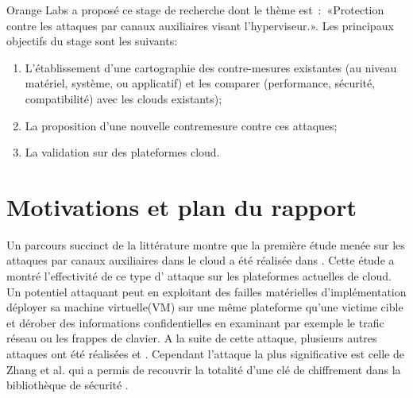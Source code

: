 Orange Labs a proposé ce stage de recherche dont le thème est : «Protection contre les attaques par canaux auxiliaires visant l’hyperviseur.». Les principaux objectifs du stage sont les suivants:
\begin{enumerate}
\item L'établissement d'une cartographie des contre-mesures existantes (au niveau matériel, système, ou applicatif) et les comparer (performance, sécurité, compatibilité) avec les clouds existants);
\item La proposition d'une nouvelle contremesure contre ces attaques;
\item La validation sur des plateformes cloud.
\end{enumerate}    

\section{Motivations et plan du rapport}    
\label{sec:plan} 

Un parcours succinct de la littérature montre que la première étude menée  sur les attaques par canaux auxiliaires dans le cloud a été réalisée dans \cite{Ris2009}. Cette étude a montré l’effectivité de ce type d' attaque sur les plateformes actuelles de cloud.  Un potentiel attaquant peut  en exploitant des  failles matérielles d’implémentation  déployer sa machine virtuelle(VM) sur une même plateforme qu’une victime cible et dérober des informations confidentielles en examinant par exemple le trafic réseau ou les frappes de clavier. A la suite de cette attaque, plusieurs autres attaques ont été réalisées \cite{Zhang2012} et \cite{Yuval}. Cependant  l’attaque la plus significative  est celle de Zhang et al. \cite{Zhang2012}  qui a permis de recouvrir la totalité d’une clé de chiffrement dans la bibliothèque de sécurité \cite{gnupg}.\newline{}

